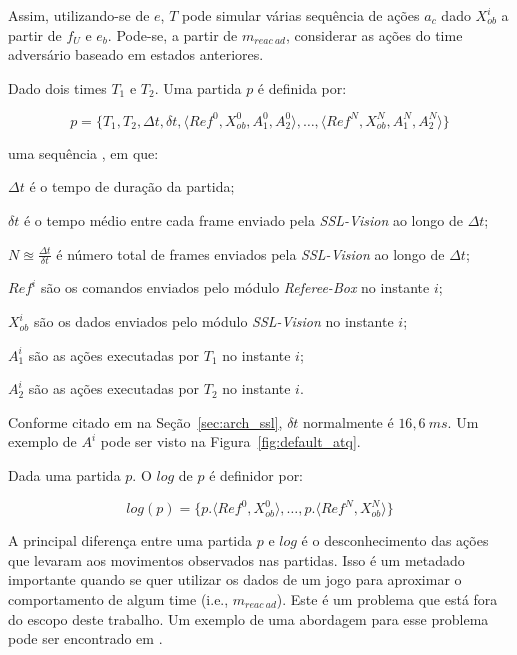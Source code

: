 Assim, utilizando-se de $e$, $T$ pode simular várias sequência de ações $a_c$
dado $X_{ob}^{i}$ a partir de $f_{U}$ e $e_b$. Pode-se, a partir de $m_{reac{\
}ad}$, considerar as ações do time adversário baseado em estados anteriores.

\begin{defi}[Partida]
  Dado dois times $T_1$ e $T_2$. Uma partida $p$ é definida por:

  \[
    p = \lbrace T_1, T_2, \Delta t, \delta t, \langle Ref^{0}, X_{ob}^{0}, A_1^{0}, A_2^{0}\rangle, 
    \dots, \langle Ref^{N}, X_{ob}^{N}, A_1^{N}, A_2^{N} \rangle \rbrace
  \]

  uma sequência , em que:
  \begin{description}
    \item $\Delta t$ é o tempo de duração da partida;
    \item $\delta t$ é o tempo médio entre cada frame enviado pela \textit{SSL-Vision} ao longo de $\Delta t$;
    \item $N \approxeq \frac{\Delta t}{\delta t}$ é número total de frames enviados pela \textit{SSL-Vision}
      ao longo de $\Delta t$;
    \item $Ref^{i}$ são os comandos enviados pelo módulo \textit{Referee-Box} no instante $i$;
    \item $X_{ob}^{i}$ são os dados enviados pelo módulo \textit{SSL-Vision} no instante $i$;
    \item $A_1^{i}$ são as ações executadas por $T_1$ no instante $i$;
    \item $A_2^{i}$ são as ações executadas por $T_2$ no instante $i$.
  \end{description}
\end{defi}

Conforme citado em na Seção~\ref{sec:arch_ssl}, $\delta t$ normalmente é $16,6{\ }ms$.
Um exemplo de $A^{i}$ pode ser visto na Figura~\ref{fig:default_atq}.

\begin{defi}[Logs]
  Dada uma partida $p$. O $log$ de $p$ é definidor por:

  \[
    log(p) = \lbrace p.\langle Ref^{0}, X_{ob}^{0}\rangle, \dots, p.\langle Ref^{N}, X_{ob}^{N}\rangle \rbrace
  \]
\end{defi}

A principal diferença entre uma partida $p$ e $log$ é o desconhecimento das
ações que levaram aos movimentos observados nas partidas. Isso é um metadado
importante quando se quer utilizar os dados de um jogo para aproximar o
comportamento de algum time (i.e., $m_{reac{\ }ad}$).  Este é um problema que
está fora do escopo deste trabalho. Um exemplo de uma abordagem para esse
problema pode ser encontrado em \cite{vail2008crf}.

